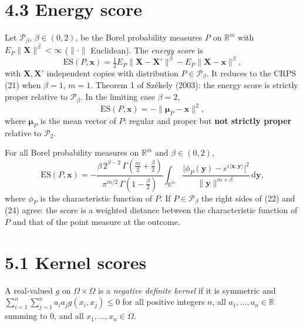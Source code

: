 \documentclass{article}
\newcommand{\1}{\mathbb{1}}
\newcommand{\R}{\mathbb{R}}
\newcommand{\bx}{\mathbf{x}}
\newcommand{\bX}{\mathbf{X}}
\newcommand{\by}{\mathbf{y}}
\begin{document}
\section*{4.3 Energy score}
Let $\mathcal{P}_\beta$, $\beta\in(0,2)$, be the Borel probability measures $P$
on $\R^m$ with $E_P\|\bX\|^\beta<\infty$ ($\|\cdot\|$ Euclidean). The
\emph{energy score} is
\begin{equation}\tag{22}
  \mathrm{ES}(P,\bx) = \tfrac12 E_P\|\bX-\bX'\|^\beta - E_P\|\bX-\bx\|^\beta ,
\end{equation}
with $\bX,\bX'$ independent copies with distribution $P\in\mathcal{P}_\beta$.
It reduces to the CRPS (21) when $\beta=1$, $m=1$. Theorem 1 of Sz\'ekely (2003):
the energy score is strictly proper relative to $\mathcal{P}_\beta$. In the
limiting case $\beta=2$,
\begin{equation}\tag{23}
  \mathrm{ES}(P,\bx) = -\|\boldsymbol\mu_P - \bx\|^2 ,
\end{equation}
where $\boldsymbol\mu_P$ is the mean vector of $P$: regular and proper but
\textbf{not strictly proper} relative to $\mathcal{P}_2$.

For all Borel probability measures on $\R^m$ and $\beta\in(0,2)$,
\begin{equation}\tag{24}
  \mathrm{ES}(P,\bx) = -\frac{\beta\,2^{\beta-2}\,\Gamma\!\left(\frac m2+\frac\beta2\right)}
  {\pi^{m/2}\,\Gamma\!\left(1-\frac\beta2\right)}
  \int_{\R^m} \frac{\bigl|\phi_P(\by) - e^{i\langle \bx,\by\rangle}\bigr|^2}{\|\by\|^{m+\beta}}\,\mathrm{d}\by ,
\end{equation}
where $\phi_P$ is the characteristic function of $P$. If $P\in\mathcal{P}_\beta$
the right sides of (22) and (24) agree: the score is a weighted distance between
the characteristic function of $P$ and that of the point measure at the outcome.

\section*{5.1 Kernel scores}
A real-valued $g$ on $\Omega\times\Omega$ is a \emph{negative definite kernel}
if it is symmetric and $\sum_{i=1}^n\sum_{j=1}^n a_i a_j g(x_i,x_j)\le 0$ for all
positive integers $n$, all $a_1,\dots,a_n\in\R$ summing to $0$, and all
$x_1,\dots,x_n\in\Omega$.
\end{document}
